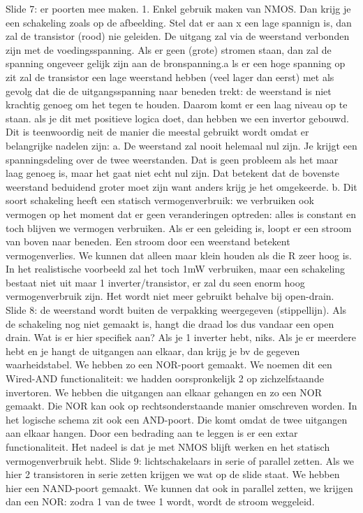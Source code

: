 \documentclass[10pt,a4paper]{book}
\begin{document}
Slide 7: er poorten mee maken. 
	1. Enkel gebruik maken van NMOS. Dan krijg je een schakeling zoals op de afbeelding. Stel dat er aan x een lage spannign is, dan zal de transistor (rood) nie geleiden. De uitgang zal via de weerstand verbonden zijn met de voedingsspanning. Als er geen (grote) stromen staan, dan zal de spanning ongeveer gelijk zijn aan de bronspanning.a ls er een hoge spanning op zit zal de transistor een lage weerstand hebben (veel lager dan eerst) met als gevolg dat die de uitgangsspanning naar beneden trekt: de weerstand is niet krachtig genoeg om het tegen te houden.  Daarom komt er een laag niveau op te staan. als je dit met positieve logica doet, dan hebben we een invertor gebouwd. Dit is teenwoordig neit de manier die meestal gebruikt wordt omdat er belangrijke nadelen zijn: 
		a. De weerstand zal nooit helemaal nul zijn. Je krijgt een spanningsdeling over de twee weerstanden. Dat is geen probleem als het maar laag genoeg is, maar het gaat niet echt nul zijn. Dat betekent dat de bovenste weerstand beduidend groter moet zijn want anders krijg je het omgekeerde.
		b. Dit soort schakeling heeft een statisch vermogenverbruik: we verbruiken ook vermogen op het moment dat er geen veranderingen optreden: alles is constant en toch blijven we vermogen verbruiken. Als er een geleiding is, loopt er een stroom van boven naar beneden. Een stroom door een weerstand betekent vermogenverlies. We kunnen dat alleen maar klein houden als die R zeer hoog is. In het realistische voorbeeld zal het toch 1mW verbruiken, maar een schakeling bestaat niet uit maar 1 inverter/transistor, er zal du seen enorm hoog vermogenverbruik zijn. 
	Het wordt niet meer gebruikt behalve bij open-drain.
Slide 8: de weerstand wordt buiten de verpakking weergegeven (stippellijn). Als de schakeling nog niet gemaakt is, hangt die draad los dus vandaar een open drain. Wat is er hier specifiek aan? Als je 1 inverter hebt, niks. Als je er meerdere hebt en je hangt de uitgangen aan elkaar, dan krijg je bv de gegeven waarheidstabel. We hebben zo een NOR-poort gemaakt. We noemen dit een Wired-AND functionaliteit: we hadden oorspronkelijk 2 op zichzelfstaande invertoren. We hebben die uitgangen aan elkaar gehangen en zo een NOR gemaakt. Die NOR kan ook op rechtsonderstaande manier omschreven worden. In het logische schema zit ook een AND-poort. Die komt omdat de twee uitgangen aan elkaar hangen. Door een bedrading aan te leggen is er een extar functionaliteit. Het nadeel is dat je met NMOS blijft werken en het statisch vermogenverbruik hebt.
Slide 9: lichtschakelaars in serie of parallel zetten. Als we hier 2 transistoren in serie zetten krijgen we wat op de slide staat. We hebben hier een NAND-poort gemaakt. We kunnen dat ook in parallel zetten, we krijgen dan een NOR: zodra 1 van de twee 1 wordt, wordt de stroom weggeleid.
\end{document}

